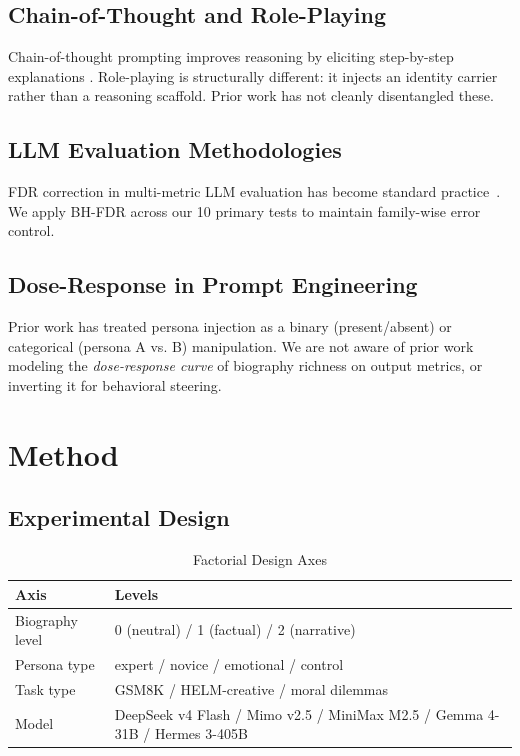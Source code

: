 \documentclass[11pt,a4paper]{article}
\begin{document}
\subsection{Chain-of-Thought and Role-Playing}
Chain-of-thought prompting improves reasoning by eliciting step-by-step explanations \citep{wei2022}. Role-playing is structurally different: it injects an identity carrier rather than a reasoning scaffold. Prior work has not cleanly disentangled these.

\subsection{LLM Evaluation Methodologies}
FDR correction in multi-metric LLM evaluation has become standard practice~\citep{bommasani2021}. We apply BH-FDR across our 10 primary tests to maintain family-wise error control.

\subsection{Dose-Response in Prompt Engineering}
Prior work has treated persona injection as a binary (present/absent) or categorical (persona A vs. B) manipulation. We are not aware of prior work modeling the \textit{dose-response curve} of biography richness on output metrics, or inverting it for behavioral steering.

\section{Method}
\label{sec:method}

\subsection{Experimental Design}

\begin{table}[H]
\centering
\caption{Factorial Design Axes}
\label{tab:design}
\begin{tabular}{ll}
\toprule
\textbf{Axis} & \textbf{Levels} \\
\midrule
Biography level & 0 (neutral) / 1 (factual) / 2 (narrative) \\
Persona type & expert / novice / emotional / control \\
Task type & GSM8K / HELM-creative / moral dilemmas \\
Model & DeepSeek v4 Flash / Mimo v2.5 / MiniMax M2.5 / Gemma 4-31B / Hermes 3-405B \\
\bottomrule
\end{tabular}
\end{table}
\end{document}
